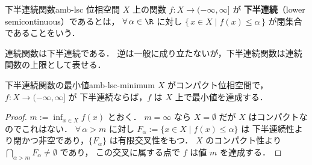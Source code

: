 \begin{definition}{下半連続関数}{amb-lsc}
  位相空間 $X$ 上の関数 $f \colon X \to (-\infty, \infty]$ が
  \textbf{下半連続}（lower semicontinuous）であるとは，
  $\forall\, \alpha \in \R$ に対し
  $\{\, x \in X \mid f(x) \leq \alpha \,\}$ が閉集合であることをいう．
\end{definition}

連続関数は下半連続である．
逆は一般に成り立たないが，下半連続関数は連続関数の上限として表せる．

\begin{theorem}{下半連続関数の最小値}{amb-lsc-minimum}
  $X$ がコンパクト位相空間で，$f \colon X \to (-\infty, \infty]$ が
  下半連続ならば，$f$ は $X$ 上で最小値を達成する．
\end{theorem}

\begin{proof}
  $m := \inf_{x \in X} f(x)$ とおく．
  $m = \infty$ なら $X = \emptyset$ だが $X$ はコンパクトなのでこれはない．
  $\forall\, \alpha > m$ に対し $F_\alpha := \{x \in X \mid f(x) \leq \alpha\}$ は
  下半連続性より閉かつ非空であり，$\{F_\alpha\}$ は有限交叉性をもつ．
  $X$ のコンパクト性より $\bigcap_{\alpha > m} F_\alpha \neq \emptyset$ であり，
  この交叉に属する点で $f$ は値 $m$ を達成する．
\end{proof}
